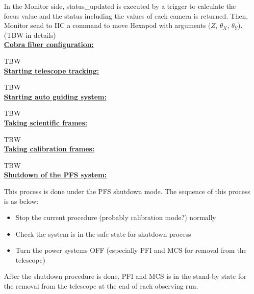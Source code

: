 \documentclass[a4paper]{article}
\begin{document}
In the Monitor side, status\_updated is executed by a trigger to calculate the focus value and the status including the values of each camera is returned. Then, Monitor send to IIC a command to move Hexapod with arguments ($Z$, $\theta_{X}$, $\theta_{Y}$). (TBW in details)\\

\noindent \underline{\textbf{Cobra fiber configuration:}}
\vspace{5pt}

TBW\\

\noindent \underline{\textbf{Starting telescope tracking:}}
\vspace{5pt}

TBW\\

\noindent \underline{\textbf{Starting auto guiding system:}}
\vspace{5pt}

TBW\\

\noindent \underline{\textbf{Taking scientific frames:}}
\vspace{5pt}

TBW\\

\noindent \underline{\textbf{Taking calibration frames:}}
\vspace{5pt}

TBW\\

\noindent \underline{\textbf{Shutdown of the PFS system:}}
\vspace{5pt}

This process is done under the PFS shutdown mode. The sequence of this process is as below:

\begin{itemize}
\item Stop the current procedure (probably calibration mode?) normally
\item Check the system is in the safe state for shutdown process
\item Turn the power systems OFF (especially PFI and MCS for removal from the telescope)
\end{itemize}

\noindent After the shutdown procedure is done, PFI and MCS is in the stand-by state for the removal from the telescope at the end of each observing run.\\

\end{document}
